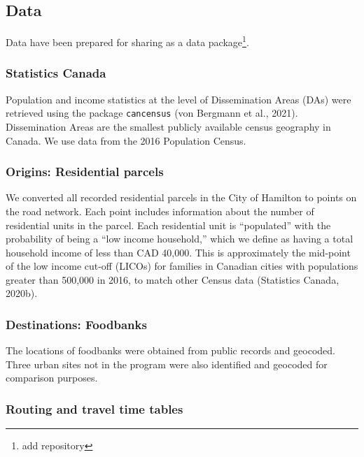 \documentclass[]{elsarticle} %
\begin{document}
\hypertarget{data}{%
\subsection{Data}\label{data}}

Data have been prepared for sharing as a data package\footnote{add
  repository}.

\hypertarget{statistics-canada}{%
\subsubsection{Statistics Canada}\label{statistics-canada}}

Population and income statistics at the level of Dissemination Areas
(DAs) were retrieved using the package \texttt{cancensus} (von Bergmann
et al., 2021). Dissemination Areas are the smallest publicly available
census geography in Canada. We use data from the 2016 Population Census.

\hypertarget{origins-residential-parcels}{%
\subsubsection{Origins: Residential
parcels}\label{origins-residential-parcels}}

We converted all recorded residential parcels in the City of Hamilton to
points on the road network. Each point includes information about the
number of residential units in the parcel. Each residential unit is
``populated'' with the probability of being a ``low income household,''
which we define as having a total household income of less than CAD
40,000. This is approximately the mid-point of the low income cut-off
(LICOs) for families in Canadian cities with populations greater than
500,000 in 2016, to match other Census data (Statistics Canada, 2020b).

\hypertarget{destinations-foodbanks}{%
\subsubsection{Destinations: Foodbanks}\label{destinations-foodbanks}}

The locations of foodbanks were obtained from public records and
geocoded. Three urban sites not in the program were also identified and
geocoded for comparison purposes.

\hypertarget{routing-and-travel-time-tables}{%
\subsubsection{Routing and travel time
tables}\label{routing-and-travel-time-tables}}
\end{document}
